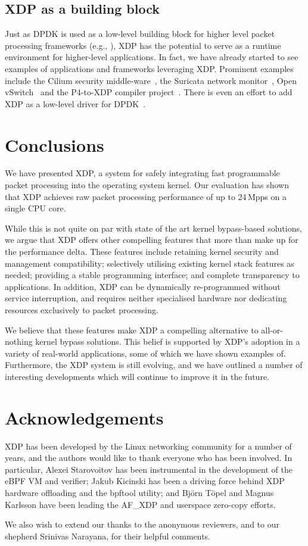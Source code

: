 \documentclass[sigconf]{acmart}
\begin{document}
\subsection{XDP as a building block}
\label{sec:xdp-building-block}

Just as DPDK is used as a low-level building block for higher level packet
processing frameworks (e.g., \cite{linguaglossa2017high}), XDP has the potential
to serve as a runtime environment for higher-level applications. In fact, we
have already started to see examples of applications and frameworks leveraging
XDP. Prominent examples include the Cilium security middle-ware~\cite{cilium},
the Suricata network monitor~\cite{suricata}, Open vSwitch~\cite{ovs-xdp} and
the P4-to-XDP compiler project~\cite{p4xdp}. There is even an effort to add XDP
as a low-level driver for DPDK~\cite{dpdk-xdp}.

\section{Conclusions}
\label{sec:conclusion}
We have presented XDP, a system for safely integrating fast programmable packet
processing into the operating system kernel. Our evaluation has shown that XDP
achieves raw packet processing performance of up to 24\,Mpps on a single CPU
core.

While this is not quite on par with state of the art kernel bypass-based
solutions, we argue that XDP offers other compelling features that more than
make up for the performance delta. These features include retaining kernel
security and management compatibility; selectively utilising existing kernel
stack features as needed; providing a stable programming interface; and complete
transparency to applications. In addition, XDP can be dynamically re-programmed
without service interruption, and requires neither specialised hardware nor
dedicating resources exclusively to packet processing.

We believe that these features make XDP a compelling alternative to
all-or-nothing kernel bypass solutions. This belief is supported by XDP's
adoption in a variety of real-world applications, some of which we have shown
examples of. Furthermore, the XDP system is still evolving, and we have outlined
a number of interesting developments which will continue to improve it in the
future.

\section*{Acknowledgements}
\label{sec:acknowledgements}
XDP has been developed by the Linux networking community for a number of years,
and the authors would like to thank everyone who has been involved. In
particular, Alexei Starovoitov has been instrumental in the development of the
eBPF VM and verifier; Jakub Kicinski has been a driving force behind XDP
hardware offloading and the bpftool utility; and Björn Töpel and Magnus Karlsson
have been leading the AF\_XDP and userspace zero-copy efforts.

We also wish to extend our thanks to the anonymous reviewers, and to our
shepherd Srinivas Narayana, for their helpful comments.




\end{document}
